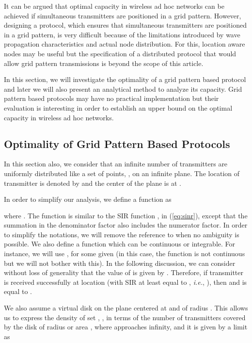 \documentclass[12pt,english]{article}
\begin{document}
It can be argued that optimal capacity in wireless ad hoc networks can be achieved if simultaneous transmitters are positioned in a grid pattern. However, designing a protocol, which ensures that simultaneous transmitters are positioned in a grid pattern, is very difficult because of the limitations introduced by wave propagation characteristics and actual node distribution. For this, location aware nodes may be useful but the specification of a distributed protocol that would allow grid pattern transmissions is beyond the scope of this article. 

In this section, we will investigate the optimality of a grid pattern based protocol and later we will also present an analytical method to analyze its capacity. Grid pattern based protocols may have no practical implementation but their evaluation is interesting in order to establish an upper bound on the optimal capacity in wireless ad hoc networks.  

\subsection{Optimality of Grid Pattern Based Protocols}
\label{sec:grid_optimality}

In this section also, we consider that an infinite number of transmitters are uniformly distributed like a set of points, \mbox{}, on an infinite  plane. The location of transmitter  is denoted by  and the center of the plane is at . 

In order to simplify our analysis, we define a function  as 
 
where \mbox{}. The function  is similar to the SIR function , in (\ref{eq:sinr}), except that the summation in the denominator factor also includes the numerator factor. In order to simplify the notations, we will remove the reference to  when no ambiguity is possible. 
We also define a function  which can be continuous or integrable. For instance, we will use \mbox{}, for some given  (in this case, the function is not continuous but we will not bother with this). In the following discussion, we can consider without loss of generality that the value of  is given by \mbox{}. Therefore, if transmitter  is received successfully at location  (with SIR at least equal to , {\it i.e.}, \mbox{}), then \mbox{} and  is equal to .

We also assume a virtual disk on the plane centered at  and of radius . This allows us to express the density of set , , in terms of the number of transmitters covered by the disk of radius  or area , where  approaches infinity, and it is given by a limit as
\end{document}

